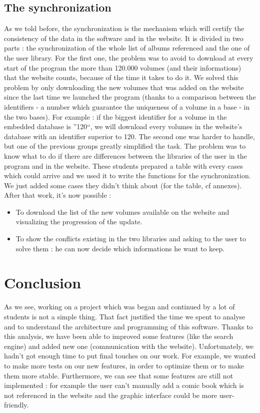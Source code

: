 \documentclass[11pt]{report} %
\begin{document}
\section{The synchronization}
As we told before, the synchronization is the mechanism which will certify the consistency of the data in the software and in the website. It is divided in two parts : the synchronization of the whole list of albums referenced and the one of the user library.
\newline For the first one, the problem was to avoid to download at every start of the program the more than 120.000 volumes (and their informations) that the website counts, because of the time it takes to do it. We solved this problem by only downloading the new volumes that was added on the website since the last time we launched the program (thanks to a comparison between the identifiers - a number which guarantee the uniqueness of a volume in a base - in the two bases).
\newline For example : if the biggest identifier for a volume in the embedded database is ''120``, we will download every volumes in the website's database with an identifier superior to 120.
\newline The second one was harder to handle, but one of the previous groups greatly simplified the task. The problem was to know what to do if there are differences between the libraries of the user in the program and in the website. These students prepared a table with every cases which could arrive and we used it to write the functions for the synchronization. We just added some cases they didn't think about (for the table, cf annexes).
\newline After that work, it's now possible :
\begin{itemize}
\item To download the list of the new volumes available on the website and visualizing the progression of the update.
\item To show the conflicts existing in the two libraries and asking to the user to solve them : he can now decide which informations he want to keep.
\end{itemize}

\chapter{Conclusion}
As we see, working on a project which was began and continued by a lot of students is not a simple thing. That fact justified the time we spent to analyse and to understand the architecture and programming of this software. Thanks to this analysis, we have been able to improved some features (like the search engine) and added new one (communication with the website). 
\newline Unfortunately, we hadn't got enough time to put final touches on our work. For example, we wanted to make more tests on our new features, in order to optimize them or to make them more stable.
\newline Furthermore, we can see that some features are still not implemented : for example the user can't manually add a comic book which is not referenced in the website and the graphic interface could be more user-friendly.


\begin{appendices}

\end{appendices}


\end{document}
